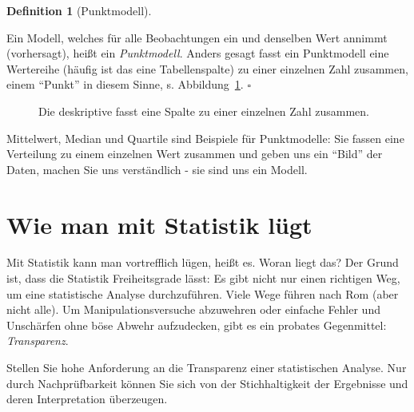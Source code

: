 \documentclass[
  letterpaper,
]{scrbook}
\theoremstyle{definition}
\theoremstyle{definition}
\theoremstyle{definition}
\newtheorem{definition}{Definition}[chapter]
\theoremstyle{remark}
\begin{document}
\begin{definition}[Punktmodell]\protect\hypertarget{def-punktmodell}{}\label{def-punktmodell}

Ein Modell, welches für alle Beobachtungen ein und denselben Wert
annimmt (vorhersagt), heißt ein \emph{Punktmodell}. Anders gesagt fasst
ein Punktmodell eine Wertereihe (häufig ist das eine Tabellenspalte) zu
einer einzelnen Zahl zusammen, einem \enquote{Punkt} in diesem Sinne, s.
Abbildung~\ref{fig-desk}. \(\square\)

\end{definition}

\begin{figure}


\caption{\label{fig-desk}Die deskriptive fasst eine Spalte zu einer
einzelnen Zahl zusammen.}

\end{figure}%

Mittelwert, Median und Quartile sind Beispiele für Punktmodelle: Sie
fassen eine Verteilung zu einem einzelnen Wert zusammen und geben uns
ein \enquote{Bild} der Daten, machen Sie uns verständlich - sie sind uns
ein Modell.

\section{Wie man mit Statistik
lügt}\label{wie-man-mit-statistik-luxfcgt-2}

Mit Statistik kann man vortrefflich lügen, heißt es. Woran liegt das?
Der Grund ist, dass die Statistik Freiheitsgrade lässt: Es gibt nicht
nur einen richtigen Weg, um eine statistische Analyse durchzuführen.
Viele Wege führen nach Rom (aber nicht alle). Um Manipulationsversuche
abzuwehren oder einfache Fehler und Unschärfen ohne böse Abwehr
aufzudecken, gibt es ein probates Gegenmittel: \emph{Transparenz}.

\label{callout-important}
Stellen Sie hohe Anforderung an die Transparenz einer statistischen
Analyse. Nur durch Nachprüfbarkeit können Sie sich von der
Stichhaltigkeit der Ergebnisse und deren Interpretation überzeugen.
\end{document}

